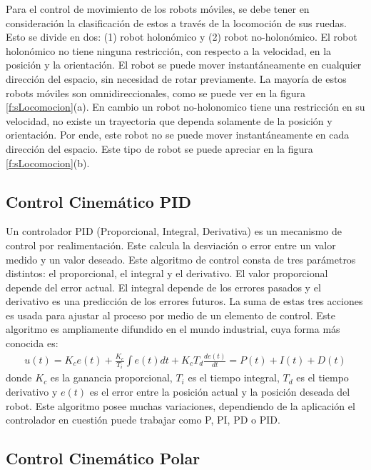 Para el control de movimiento de los robots móviles, se debe tener en consideración 
la clasificación de estos a través de la locomoción de sus ruedas. Esto se divide 
en dos: (1) robot holon\'omico y (2) robot no-holon\'omico. El robot holon\'omico 
no tiene ninguna restricci\'on, con respecto a la velocidad, en la posici\'on y 
la orientaci\'on. El robot se puede mover instant\'aneamente en cualquier direcci\'on 
del espacio, sin necesidad de rotar previamente. La mayor\'ia de estos robots 
m\'oviles son omnidireccionales, como se puede ver en la figura 
\ref{f:sLocomocion}(a). En cambio un robot no-holonomico tiene una restricci\'on 
en su velocidad, no existe un trayectoria que dependa solamente de la posici\'on y 
orientaci\'on. Por ende, este robot no se puede mover instant\'aneamente en cada 
direcci\'on del espacio. Este tipo de robot se puede apreciar en la 
figura \ref{f:sLocomocion}(b).

\subsection{Control Cinem\'atico PID}

Un controlador PID (Proporcional, Integral, Derivativa) es un mecanismo de control 
por realimentaci\'on. Este calcula la desviaci\'on o error entre un valor medido y 
un valor deseado. Este algoritmo de control consta de tres par\'ametros distintos: el 
proporcional, el integral y el derivativo. El valor proporcional depende del error 
actual. El integral depende de los errores pasados y el derivativo es una predicci\'on 
de los errores futuros. La suma de estas tres acciones es usada para ajustar al 
proceso por medio de un elemento de control. Este algoritmo es ampliamente 
difundido en el mundo industrial, cuya forma m\'as conocida es:
\begin{align*}
u(t) = K_c e(t) + \frac{K_c}{T_i} \int e(t)dt + K_c T_d \frac{de(t)}{dt} = P(t) + I(t) + D(t)
\end{align*}
donde $K_c$ es la ganancia proporcional, $T_i$ es el tiempo integral, $T_d$ es 
el tiempo derivativo y $e(t)$ es el error entre la posici\'on actual y la posici\'on deseada
del robot. Este algoritmo posee muchas variaciones, dependiendo de la aplicaci\'on el controlador 
en cuesti\'on puede trabajar como P, PI, PD o PID.

\subsection{Control Cinem\'atico Polar}

